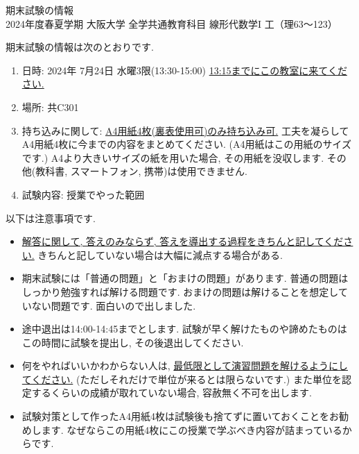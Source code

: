 \documentclass[dvipdfmx,a4paper,11pt]{article}
\theoremstyle{definition}
\begin{document}
\pagestyle{empty}




\begin{center}
{\LARGE 期末試験の情報 } \\
2024年度春夏学期 大阪大学 全学共通教育科目 線形代数学I 工（理63〜123）
\end{center}

期末試験の情報は次のとおりです. 
\begin{enumerate}
\item 日時: 2024年 7月24日 水曜3限(13:30-15:00) \underline{13:15までにこの教室に来てください.}
\item 場所: 共C301
\item 持ち込みに関して: \underline{A4用紙4枚(裏表使用可)のみ持ち込み可.} 工夫を凝らしてA4用紙4枚に今までの内容をまとめてください. (A4用紙はこの用紙のサイズです.) A4より大きいサイズの紙を用いた場合, その用紙を没収します. その他(教科書, スマートフォン, 携帯)は使用できません.
\item 試験内容: 授業でやった範囲
\end{enumerate}

以下は注意事項です.
\begin{itemize}
  \setlength{\parskip}{0cm} 
 \setlength{\itemsep}{0cm}
 
 \item \underline{解答に関して, 答えのみならず, 答えを導出する過程をきちんと記してください.} きちんと記していない場合は大幅に減点する場合がある.
 \item 期末試験には「普通の問題」と「おまけの問題」があります. 普通の問題はしっかり勉強すれば解ける問題です. おまけの問題は解けることを想定していない問題です. 面白いので出しました.  

\item 途中退出は14:00-14:45までとします. 試験が早く解けたものや諦めたものはこの時間に試験を提出し, その後退出してください. 
\item 何をやればいいかわからない人は, \underline{最低限として演習問題を解けるようにしてください.} (ただしそれだけで単位が来るとは限らないです.) また単位を認定するくらいの成績が取れていない場合, 容赦無く不可を出します.

\item 試験対策として作ったA4用紙4枚は試験後も捨てずに置いておくことをお勧めします. なぜならこの用紙4枚にこの授業で学ぶべき内容が詰まっているからです. 
\end{itemize}
\end{document}
